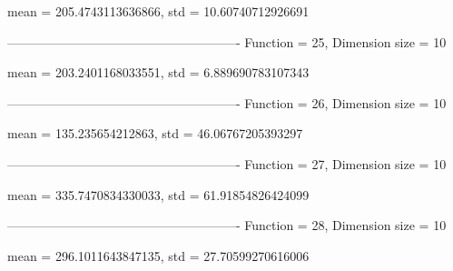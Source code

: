 mean = 205.4743113636866, std = 10.60740712926691

-------------------------------------------------------
Function = 25, Dimension size = 10


mean = 203.2401168033551, std = 6.889690783107343

-------------------------------------------------------
Function = 26, Dimension size = 10


mean = 135.235654212863, std = 46.06767205393297

-------------------------------------------------------
Function = 27, Dimension size = 10


mean = 335.7470834330033, std = 61.91854826424099

-------------------------------------------------------
Function = 28, Dimension size = 10


mean = 296.1011643847135, std = 27.70599270616006